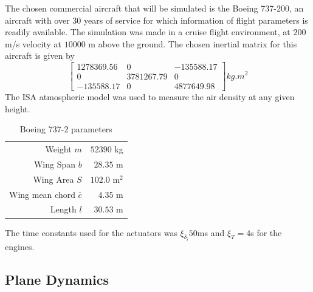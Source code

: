 The chosen commercial aircraft that will be simulated is the Boeing 737-200, an aircraft with over 30 years of service for which information of flight parameters is readily available. The simulation was made in a cruise flight environment, at $200$ m/s velocity at $10000$ m above the ground. The chosen inertial matrix for this aircraft is given by
\begin{equation}
\begin{bmatrix}
1278369.56 & 0 & -135588.17\\
0 & 3781267.79 & 0\\
-135588.17 & 0 & 4877649.98
\end{bmatrix}
kg.m^2
\end{equation}
The ISA atmospheric model was used to measure the air density at any given height.
\begin{table}[htbp]
  \centering
  \caption{Boeing 737-2 parameters}
    \begin{tabular}{rr}
    \toprule
    Weight $m$ & $52390$ kg \\
    Wing Span $b$ & $28.35$ m \\
    Wing Area $S$ & $102.0$ m$^{2}$ \\
    Wing mean chord $\bar{c}$ & $4.35$ m \\
    Length $l$ & $30.53$ m \\
    \bottomrule
    \end{tabular}%
  \label{tab:b737_parameters}
\end{table}%
The time constants used for the actuators was $\xi_{\delta_i}50$ms and $\xi_T=4$s for the engines.
\subsection{Plane Dynamics}
\label{section:model/plane_dynamics}

